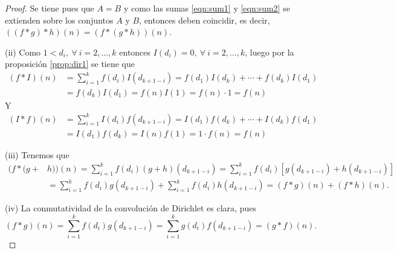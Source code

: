 \begin{proof}
Se tiene pues que $A=B$ y como las sumas \eqref{eqn:sum1} y \eqref{eqn:sum2} se extienden sobre los conjuntos $A$ y $B$, entonces deben coincidir, es decir, $((f*g)*h)(n)=(f*(g*h))(n)$.
\bigskip

(ii) Como $1<d_i,\:\forall \: i=2,\ldots,k$ entonces $I(d_i)=0,\:\forall \: i=2,\ldots,k$, luego por la proposición \eqref{prop:dir1} se tiene que
\begin{align*}
	(f*I)(n) &= \sum_{i=1}^{k} f(d_i)I(d_{k+1-i})=f(d_1)I(d_k)+\cdots+f(d_k)I(d_1) \\
			 &= f(d_k)I(d_1)=f(n)I(1)=f(n)\cdot 1=f(n)
\end{align*}
Y
\begin{align*}
	(I*f)(n) &= \sum_{i=1}^{k} I(d_i)f(d_{k+1-i})=I(d_1)f(d_k)+\cdots+I(d_k)f(d_1) \\
			 &= I(d_1)f(d_k)=I(n)f(1)=1\cdot f(n)=f(n)
\end{align*}
\bigskip

(iii) Tenemos que 
\begin{align*}
	(f*(g+ & h)) (n) = \sum_{i=1}^{k} f(d_i)(g+h)(d_{k+1-i}) = \sum_{i=1}^{k} f(d_i)[g(d_{k+1-i})+h(d_{k+1-i})] \\
		   & = \sum_{i=1}^{k} f(d_i)g(d_{k+1-i})+\sum_{i=1}^{k} f(d_i)h(d_{k+1-i}) = (f*g)(n)+(f*h)(n).
\end{align*}
\bigskip

(iv) La conmutatividad de la convolución de Dirichlet es clara, pues 
\begin{equation*}
	(f*g)(n) = \sum_{i=1}^{k} f(d_i)g(d_{k+1-i}) = \sum_{i=1}^{k} g(d_i)f(d_{k+1-i})=(g*f)(n).
\end{equation*}
\end{proof}
